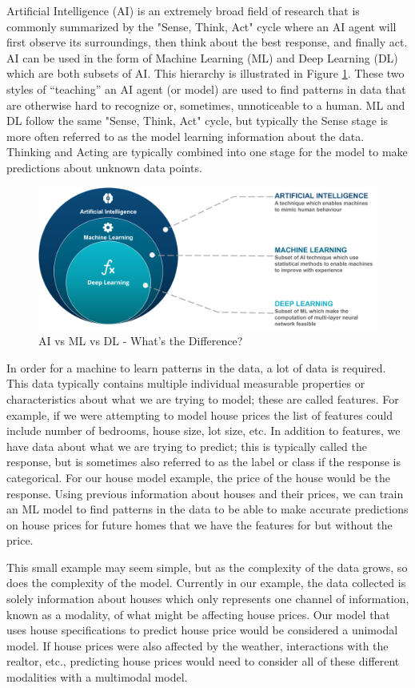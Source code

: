 Artificial Intelligence (AI) is an extremely broad field of research that is commonly summarized by the "Sense, Think, Act" cycle where an AI agent will first observe its surroundings, then think about the best response, and finally act. AI can be used in the form of Machine Learning (ML) and Deep Learning (DL) which are both subsets of AI. This hierarchy is illustrated in Figure \ref{fig:ai}. These two styles of ``teaching'' an AI agent (or model) are used to find patterns in data that are otherwise hard to recognize or, sometimes, unnoticeable to a human. ML and DL follow the same "Sense, Think, Act" cycle, but typically the Sense stage is more often referred to as the model learning information about the data. Thinking and Acting are typically combined into one stage for the model to make predictions about unknown data points.

\begin{figure}[!htb]
\centering
\includegraphics[width=.5\textwidth]{figures/AI-vs-ML-vs-Deep-Learning.png}
\caption{\label{fig:ai} AI vs ML vs DL - What's the Difference? \cite{atul_ai_2018}}
\end{figure}

In order for a machine to learn patterns in the data, a lot of data is required. This data typically contains multiple individual measurable properties or characteristics about what we are trying to model; these are called features. For example, if we were attempting to model house prices the list of features could include number of bedrooms, house size, lot size, etc. In addition to features, we have data about what we are trying to predict; this is typically called the response, but is sometimes also referred to as the label or class if the response is categorical. For our house model example, the price of the house would be the response. Using previous information about houses and their prices, we can train an ML model to find patterns in the data to be able to make accurate predictions on house prices for future homes that we have the features for but without the price.

This small example may seem simple, but as the complexity of the data grows, so does the complexity of the model. Currently in our example, the data collected is solely information about houses which only represents one channel of information, known as a modality, of what might be affecting house prices. Our model that uses house specifications to predict house price would be considered a unimodal model. If house prices were also affected by the weather, interactions with the realtor, etc., predicting house prices would need to consider all of these different modalities with a multimodal model.


